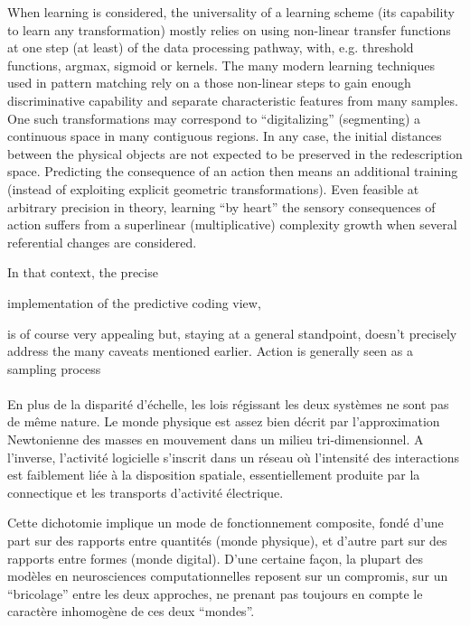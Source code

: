 \documentclass[11pt]{article}
\begin{document}
When learning is considered, the universality of a learning scheme  (its capability to learn any transformation) mostly relies on using non-linear transfer functions at one step (at least) of the data processing pathway, with, e.g. threshold functions, argmax, sigmoid or kernels. The many modern learning techniques used in pattern matching rely on a those non-linear steps to gain enough discriminative capability and separate characteristic features from many samples. 
One such transformations may correspond to ``digitalizing'' (segmenting) a continuous space in many contiguous regions. In any case, the initial distances between the physical objects are not expected to be preserved in the redescription space. Predicting the consequence of an action then means an additional training (instead of exploiting explicit geometric transformations). 
Even feasible at arbitrary precision in theory, learning ``by heart'' the sensory consequences of action suffers from a superlinear (multiplicative) complexity growth  when several referential  changes are considered.      




In that context, the precise 



implementation of the predictive coding view,  

is of course very appealing but, staying at a general standpoint, doesn't precisely address the many caveats mentioned earlier. 
Action is generally seen as a sampling process 


\paragraph{}
En plus de la disparité d'échelle, les lois régissant les deux systèmes ne sont pas de même nature. 
Le monde physique est assez bien décrit par 
l'approximation Newtonienne des masses en mouvement dans un milieu tri-dimensionnel.
A l'inverse, l'activité logicielle s'inscrit dans un réseau où l'intensité des interactions est 
faiblement liée à la disposition spatiale, essentiellement produite par la connectique et 
les transports d'activité électrique.

Cette dichotomie  implique un mode de fonctionnement composite, fondé d'une part sur des rapports entre quantités (monde physique), 
et d'autre part sur des rapports entre formes (monde digital).
D'une certaine façon, la plupart des modèles en neurosciences computationnelles 
reposent sur un compromis, sur un ``bricolage'' entre les deux approches, ne prenant pas 
toujours en compte le caractère inhomogène de ces deux ``mondes''.
\end{document}
